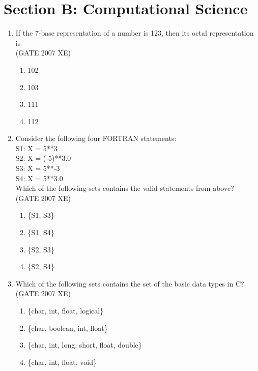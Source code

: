 \documentclass[journal,cmex10]{IEEEtran}
\theoremstyle{remark}
\numberwithin{equation}{enumi}
\numberwithin{figure}{enumi}
\begin{document}
\newpage

\section*{Section B: Computational Science}
\vspace{2\baselineskip}
\begin{enumerate}[label=\arabic*)]

    \item If the 7-base representation of a number is 123, then its octal representation is\\
   \hfill{(GATE 2007 XE)}
   \begin{multicols}{4}
    \begin{enumerate}
        \item 102
        \item 103
        \item 111
        \item 112
    \end{enumerate}
    \end{multicols}

    \item Consider the following four FORTRAN statements: \\
    S1: X = 5**3 \\
    S2: X = (-5)**3.0 \\
    S3: X = 5**-3 \\
    S4: X = 5**3.0 \\
    Which of the following sets contains the valid statements from above?\\
    \hfill{(GATE 2007 XE)}
    \begin{multicols}{4}
    \begin{enumerate}
        \item \{S1, S3\}
        \item \{S1, S4\}
        \item \{S2, S3\}
        \item \{S2, S4\}
    \end{enumerate}
    \end{multicols}

    \item Which of the following sets contains the set of the basic data types in C?\\
    \hfill{(GATE 2007 XE)}
    \begin{multicols}{2}
    \begin{enumerate}
        \item \{char, int, float, logical\}
        \item \{char, boolean, int, float\}
        \item \{char, int, long, short, float, double\}
        \item \{char, int, float, void\}
    \end{enumerate}
\end{multicols}


\end{enumerate}
\end{document}
